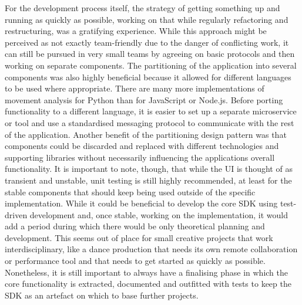 For the development process itself, the strategy of getting something up and running as quickly as possible, working on that while regularly refactoring and restructuring, was a gratifying experience.
While this approach might be perceived as not exactly team-friendly due to the danger of conflicting work, it can still be pursued in very small teams by agreeing on basic protocols and then working on separate components.
The partitioning of the application into several components was also highly beneficial because it allowed for different languages to be used where appropriate.
There are many more implementations of movement analysis for Python than for JavaScript or Node.js.
Before porting functionality to a different language, it is easier to set up a separate microservice or tool and use a standardised messaging protocol to communicate with the rest of the application.
Another benefit of the partitioning design pattern was that components could be discarded and replaced with different technologies and supporting libraries without necessarily influencing the application\textquotesingle s overall functionality.
It is important to note, though, that while the \ac{UI} is thought of as transient and unstable, unit testing is still highly recommended, at least for the stable components that should keep being used outside of the specific implementation.
While it could be beneficial to develop the core \ac{SDK} using test-driven development and, once stable, working on the implementation, it would add a period during which there would be only theoretical planning and development.
This seems out of place for small creative projects that work interdisciplinary, like a dance production that needs its own remote collaboration or performance tool and that needs to get started as quickly as possible.
Nonetheless, it is still important to always have a finalising phase in which the core functionality is extracted, documented and outfitted with tests to keep the \ac{SDK} as an artefact on which to base further projects.
